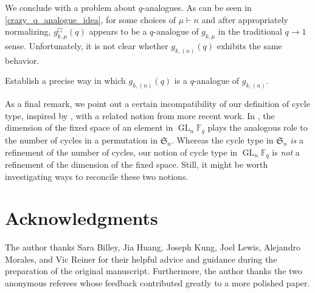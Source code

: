 \documentclass[Unicode,ALCO]{cedram}
\DeclareMathOperator{\GL}{GL}
\newcommand{\F}{\mathbb{F}}
\newcommand{\FS}{\mathfrak{S}}
\begin{document}
We conclude with a problem about \(q\)-analogues.
As can be seen in \eqref{crazy_q_analogue_idea}, for some choices of \(\mu \vdash n\) and after appropriately normalizing, \(g_{k,\mu}^\Box (q)\) appears to be a \(q\)-analogue of \(g_{k,\mu}\) in the traditional \(q \to 1\) sense.
Unfortunately, it is not clear whether \(g_{k,(n)} (q)\) exhibits the same behavior.

\begin{problem}
Establish a precise way in which \(g_{k,(n)} (q)\) is a \(q\)-analogue of \(g_{k,(n)}\).
\end{problem}



As a final remark, we point out a certain incompatibility of our definition of cycle type, inspired by \cite{kung,stong}, with a related notion from more recent work.
In \cite{HLR,LM,refl_fact}, the dimension of the fixed space of an element in \(\GL_n \F_q\) plays the analogous role to the number of cycles in a permutation in \(\FS_n\).
Whereas the cycle type in \(\FS_n\) \emph{is} a refinement of the number of cycles, our notion of cycle type in \(\GL_n \F_q\) is \emph{not} a refinement of the dimension of the fixed space.
Still, it might be worth investigating ways to reconcile these two notions.








\section*{Acknowledgments}

The author thanks
Sara Billey,
Jia Huang,
Joseph Kung,
Joel Lewis,
Alejandro Morales, and
Vic Reiner
for their helpful advice and guidance during the preparation of the original manuscript.
Furthermore, the author thanks the two anonymous referees whose feedback contributed greatly to a more polished paper.









\end{document}
